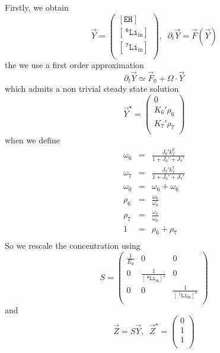 \documentclass[aps,onecolumn,11pt]{revtex4}
\newcommand{\mychem}[1]{\mathtt{#1}}
\newcommand{\myconc}[1]{\left\lbrack{#1}\right\rbrack}
\newcommand{\spLi}[1]{{~^{\mychem{#1}}\mychem{Li}}}
\newcommand{\spLiIn}[1]{{\spLi{#1}}_{\mathrm{in}}}
\newcommand{\LiIn}[1]{\myconc{\spLiIn{#1}}}
\newcommand{\spEHin}{\mychem{EH}}
\newcommand{\EHin}{\myconc{\spEHin}}
\begin{document}
Firstly, we obtain
\begin{equation}
	\vec{Y} = 
	\begin{pmatrix}
	\EHin\\
	\LiIn{6}\\
	\LiIn{7}\\
	\end{pmatrix}
	,\;\;
	\partial_t \vec{Y} = \vec{F}\left(\vec{Y}\right) 
\end{equation}
the we use a first order approximation
\begin{equation}
		\partial_t \vec{Y} \simeq \vec{F}_0 + \Omega\cdot\vec{Y}
\end{equation}
which admits a non trivial steady state solution
\begin{equation}
	\vec{Y}^\star = \begin{pmatrix}
	0\\
	K_6' \rho_6\\
	K_7'\rho_7\\
	\end{pmatrix}
\end{equation}
when we define
\begin{equation}
	\begin{array}{rcl}
	\omega_6 & = & \frac{J_6' k_f^6}{1+J_6'+J_7'}\\
	\omega_7 & = & \frac{J_7' k_f^7}{1+J_6'+J_7'}\\
	\omega_0 & = & \omega_6+\omega_6\\
	\rho_6   & = & \frac{\omega_6}{\omega_0}\\
	\rho_7   & = & \frac{\omega_7}{\omega_0}\\
	1        & = & \rho_6 + \rho_7\\
	\end{array}
\end{equation}
So we rescale the concentration using
\begin{equation}
	S = 
	\begin{pmatrix}
	\frac{1}{E_0} & 0 & 0 \\
	0 & \frac{1}{\LiIn{6}^\star}&0\\
	0 & 0 & \frac{1}{\LiIn{7}^\star}\\
	\end{pmatrix}
\end{equation}
and
\begin{equation}
	\vec{Z} = S \vec{Y},\;\;\vec{Z}^\star = \begin{pmatrix} 0\\1\\1\\ \end{pmatrix}
\end{equation}
\end{document}
